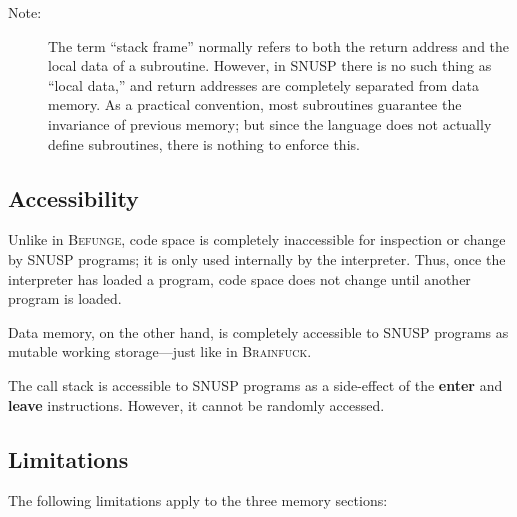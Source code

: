 \documentclass[a4paper]{article}
\newcommand\comment[2]{\begin{description} \item[#1] #2 \end{description}}
\newcommand\note[1]{\comment{Note:}{#1}}
\begin{document}
\note{The term ``stack frame'' normally refers to both the return address and
the local data of a subroutine.  However, in \textsc{SNUSP} there is no such
thing as ``local data,'' and return addresses are completely separated from
data memory.  As a practical convention, most subroutines guarantee the
invariance of previous memory; but since the language does not actually define
subroutines, there is nothing to enforce this.}



\subsection{Accessibility}

Unlike in \textsc{Befunge}, code space is completely inaccessible for
inspection or change by \textsc{SNUSP} programs; it is only used internally by
the interpreter.  Thus, once the interpreter has loaded a program, code space
does not change until another program is loaded.

Data memory, on the other hand, is completely accessible to \textsc{SNUSP}
programs as mutable working storage---just like in \textsc{Brainfuck}.

The call stack is accessible to \textsc{SNUSP} programs as a side-effect of
the \textbf{enter} and \textbf{leave} instructions.  However, it cannot be
randomly accessed.



\subsection{Limitations}

The following limitations apply to the three memory sections:
\end{document}
